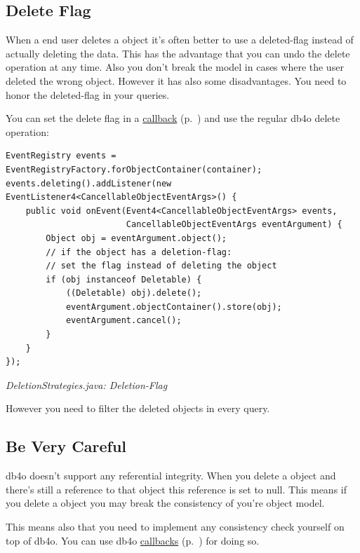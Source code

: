 \subsection*{Delete Flag}

When a end user deletes a object it's often better to use a deleted-flag instead of actually deleting the data. This has the advantage that you can undo the delete operation at any time. Also you don't break the model in cases where the user deleted the wrong object. However it has also some disadvantages. You need to honor the deleted-flag in your queries.

You can set the delete flag in a \hyperref[ref:advanced-topics-callbacks]{callback} (p.~\pageref{ref:advanced-topics-callbacks}) and use the regular db4o delete operation:

\begin{lstlisting}
EventRegistry events = EventRegistryFactory.forObjectContainer(container);
events.deleting().addListener(new EventListener4<CancellableObjectEventArgs>() {
    public void onEvent(Event4<CancellableObjectEventArgs> events,
                        CancellableObjectEventArgs eventArgument) {
        Object obj = eventArgument.object();
        // if the object has a deletion-flag:
        // set the flag instead of deleting the object
        if (obj instanceof Deletable) {
            ((Deletable) obj).delete();
            eventArgument.objectContainer().store(obj);
            eventArgument.cancel();
        }
    }
});
\end{lstlisting}

{\small\itshape DeletionStrategies.java: Deletion-Flag\par}
\medskip

However you need to filter the deleted objects in every query.

\subsection*{Be Very Careful}

db4o doesn't support any referential integrity. When you delete a object and there's still a reference to that object this reference is set to null. This means if you delete a object you may break the consistency of you're object model.

This means also that you need to implement any consistency check yourself on top of db4o. You can use db4o \hyperref[ref:advanced-topics-callbacks]{callbacks} (p.~\pageref{ref:advanced-topics-callbacks}) for doing so.

